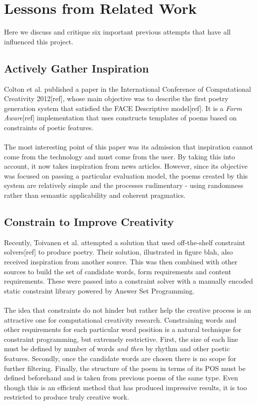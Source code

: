 \section{Lessons from Related Work}
Here we discuss and critique six important previous attempts that have all influenced this project.

\subsection{Actively Gather Inspiration}

Colton et al. published a paper in the International Conference of Computational Creativity 2012[ref], whose main objective was to describe the first poetry generation system that satisfied the FACE Descriptive model[ref]. It is a \textit{Form Aware}[ref] implementation that uses constructs templates of poems based on constraints of poetic features.
\\\\
The most interesting point of this paper was its admission that inspiration cannot come from the technology and must come from the user. By taking this into account, it now takes inspiration from news articles. However, since its objective was focused on passing a particular evaluation model, the poems created by this system are relatively simple and the processes rudimentary - using randomness rather than semantic applicability and coherent pragmatics.

\subsection{Constrain to Improve Creativity}

Recently, Toivanen et al. attempted a solution that used off-the-shelf constraint solvers[ref] to produce poetry. Their solution, illustrated in figure blah, also received inspiration from another source. This was then combined with other sources to build the set of candidate words, form requirements and content requirements. These were passed into a constraint solver with a manually encoded static constraint library powered by Answer Set Programming.
\\\\
The idea that constraints do not hinder but rather help the creative process is an attractive one for computational creativity research. Constraining words and other requirements for each particular word position is a natural technique for constraint programming, but extremely restrictive. First, the size of each line must be defined by number of words \textit{and then} by rhythm and other poetic features. Secondly, once the candidate words are chosen there is no scope for further filtering. Finally, the structure of the poem in terms of its POS must be defined beforehand and is taken from previous poems of the same type. Even though this is an efficient method that has produced impressive results, it is too restricted to produce truly creative work.

